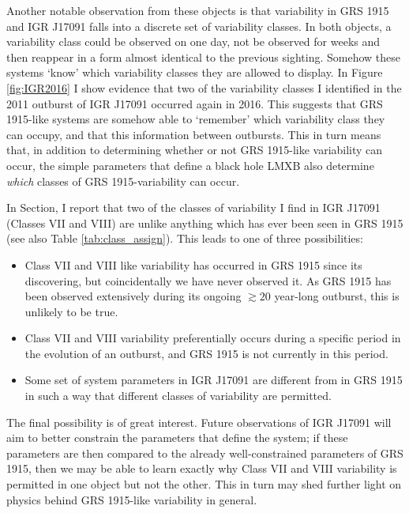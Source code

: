 \par Another notable observation from these objects is that variability in GRS 1915 and IGR J17091 falls into a discrete set of variability classes.  In both objects, a variability class could be observed on one day, not be observed for weeks and then reappear in a form almost identical to the previous sighting.  Somehow these systems `know' which variability classes they are allowed to display.  In Figure \ref{fig:IGR2016} I show evidence that two of the variability classes I identified in the 2011 outburst of IGR J17091 occurred again in 2016.  This suggests that GRS 1915-like systems are somehow able to `remember' which variability class they can occupy, and that this information between outbursts.  This in turn means that, in addition to determining whether or not GRS 1915-like variability can occur, the simple parameters that define a black hole LMXB also determine \textit{which} classes of GRS 1915-variability can occur.
\par In Section, I report that two of the classes of variability I find in IGR J17091 (Classes VII and VIII) are unlike anything which has ever been seen in GRS 1915 (see also Table \ref{tab:class_assign}).  This leads to one of three possibilities:
\begin{itemize}
\item Class VII and VIII like variability has occurred in GRS 1915 since its discovering, but coincidentally we have never observed it.  As GRS 1915 has been observed extensively during its ongoing $\gtrsim20$ year-long outburst, this is unlikely to be true.
\item Class VII and VIII variability preferentially occurs during a specific period in the evolution of an outburst, and GRS 1915 is not currently in this period.
\item Some set of system parameters in IGR J17091 are different from in GRS 1915 in such a way that different classes of variability are permitted.
\end{itemize}
\par The final possibility is of great interest.  Future observations of IGR J17091 will aim to better constrain the parameters that define the system; if these parameters are then compared to the already well-constrained parameters of GRS 1915, then we may be able to learn exactly why Class VII and VIII variability is permitted in one object but not the other.  This in turn may shed further light on physics behind GRS 1915-like variability in general.

